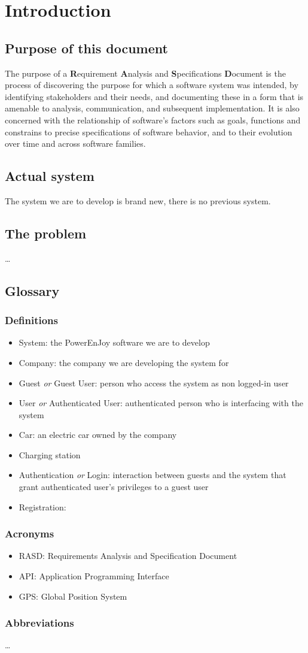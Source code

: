 \section{Introduction}
\subsection{Purpose of this document}
The purpose of a \textbf{R}equirement \textbf{A}nalysis and \textbf{S}pecifications \textbf{D}ocument is the process of discovering the purpose for which a software system was intended, by identifying stakeholders and their needs, and documenting these in a form that is amenable to analysis, communication, and subsequent implementation.  It is also concerned with the relationship of software's factors such as goals, functions and constrains to precise specifications of software behavior, and to their evolution over time and across software families.

	\subsection{Actual system}
The system we are to develop is brand new, there is no previous system.
\subsection{The problem}
 \ldots
\subsection{Glossary}
	\subsubsection{Definitions}
	\begin{itemize}
		\item System: the PowerEnJoy software we are to develop
		\item Company: the company we are developing the system for
		\item Guest \emph{or} Guest User: person who access the system as non logged-in user
		\item User \emph{or} Authenticated User: authenticated person who is interfacing with the system
		\item Car: an electric car owned by the company
		\item Charging station
		\item Authentication \emph{or} Login: interaction between guests and the system that grant authenticated user's privileges to a guest user
		\item Registration:
	\end{itemize}
\subsubsection{Acronyms}
	\begin{itemize}
		\item RASD: Requirements Analysis and Specification Document
		\item API: Application Programming Interface
		\item GPS: Global Position System
	\end{itemize}
\subsubsection{Abbreviations}
 \ldots
